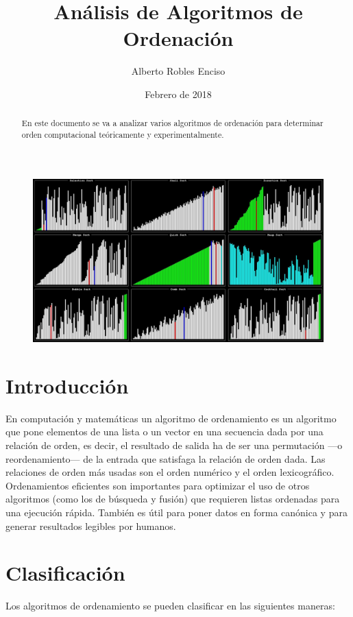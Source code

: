 \documentclass[8pt, A4]{article}    %
\title{Análisis de Algoritmos de Ordenación}
\author{Alberto Robles Enciso}
\date{Febrero de 2018}
\begin{document}
\maketitle

\begin{figure}[h]
\begin{center}
\includegraphics[width=1\textwidth]{graph/intro}
\end{center}
\end{figure}

\begin{abstract}
En este documento se va a analizar varios algoritmos de ordenación para determinar orden computacional teóricamente y experimentalmente.
\end{abstract}

\newpage

\tableofcontents

\newpage

\section{Introducción}
En computación y matemáticas un algoritmo de ordenamiento es un algoritmo que pone elementos de una lista o un vector en una secuencia dada por una relación de orden, es decir, el resultado de salida ha de ser una permutación —o reordenamiento— de la entrada que satisfaga la relación de orden dada. Las relaciones de orden más usadas son el orden numérico y el orden lexicográfico. Ordenamientos eficientes son importantes para optimizar el uso de otros algoritmos (como los de búsqueda y fusión) que requieren listas ordenadas para una ejecución rápida. También es útil para poner datos en forma canónica y para generar resultados legibles por humanos.

\section{Clasificación}
Los algoritmos de ordenamiento se pueden clasificar en las siguientes maneras:
\end{document}
